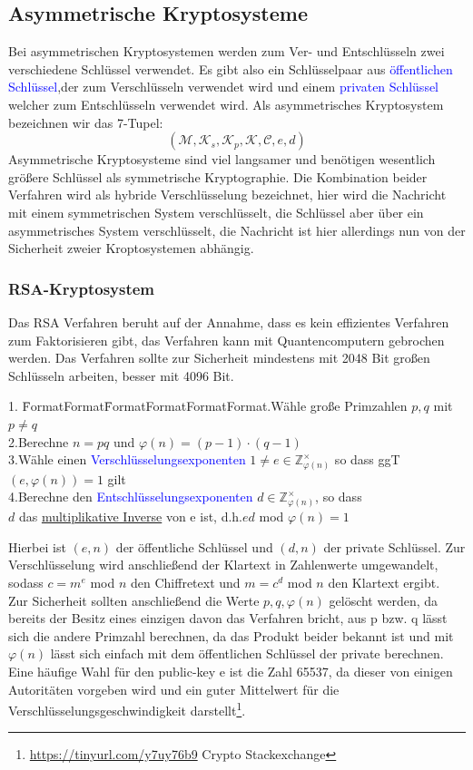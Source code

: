 \documentclass[a4paper,12pt,leqno]{article}
\newcommand{\blue}[1]{\textcolor{blue}{#1}}
\begin{document}
\subsection{Asymmetrische Kryptosysteme}
Bei asymmetrischen Kryptosystemen werden zum Ver- und Entschlüsseln zwei verschiedene Schlüssel verwendet. Es gibt also ein Schlüsselpaar aus \blue{öffentlichen Schlüssel},der zum Verschlüsseln verwendet wird und einem \blue{privaten Schlüssel} welcher zum Entschlüsseln verwendet wird.
Als asymmetrisches Kryptosystem bezeichnen wir das 7-Tupel: $$(\mathcal{M},\mathcal{K}_s, \mathcal{K}_p,\mathcal{K},\mathcal{C},e,d)$$
Asymmetrische Kryptosysteme sind viel langsamer und benötigen wesentlich größere Schlüssel als symmetrische Kryptographie. Die Kombination beider Verfahren wird als hybride Verschlüsselung bezeichnet, hier wird die Nachricht mit einem symmetrischen System verschlüsselt, die Schlüssel aber über ein asymmetrisches System verschlüsselt, die Nachricht ist hier allerdings nun von der Sicherheit zweier Kroptosystemen abhängig.
\subsubsection{RSA-Kryptosystem}
Das RSA Verfahren beruht auf der Annahme, dass es kein effizientes Verfahren zum Faktorisieren gibt, das Verfahren kann mit Quantencomputern gebrochen werden.
Das Verfahren sollte zur Sicherheit mindestens mit 2048 Bit großen Schlüsseln arbeiten, besser mit 4096 Bit.
\begin{tabbing}
1. \= FormatFormat\= FormatFormatFormatFormat.\>Wähle große Primzahlen $p,q$ mit $p\neq q$\\
2.\>Berechne $n=pq$ und $\varphi(n)=(p-1)\cdot(q-1)$\\
3.\>Wähle einen \blue{Verschlüsselungsexponenten} $1\neq e\in \mathbb{Z}_{\varphi(n)}^\times$ so dass ggT$(e,\varphi(n))=1$ gilt\\
4.\>Berechne den \blue{Entschlüsselungsexponenten} $d\in\mathbb{Z}_{\varphi(n)}^\times$, so dass \\
\>\>$d$ das \hyperref[sec:euklid]{multiplikative Inverse} von e ist, d.h.$ed$ mod $\varphi(n)=1$
\end{tabbing}
Hierbei ist $(e,n)$ der öffentliche Schlüssel und $(d,n)$ der private Schlüssel.
Zur Verschlüsselung wird anschließend der Klartext in Zahlenwerte umgewandelt, sodass $c=m^e$ mod $n$ den Chiffretext und $m = c^d$ mod $n$ den Klartext ergibt.\\
Zur Sicherheit sollten anschließend die Werte $p,q,\varphi(n)$ gelöscht werden, da bereits der Besitz eines einzigen davon das Verfahren bricht, aus p bzw. q lässt sich die andere Primzahl berechnen, da das Produkt beider bekannt ist und mit $\varphi(n)$ lässt sich einfach mit dem öffentlichen Schlüssel der private berechnen.\\ Eine häufige Wahl für den public-key e ist die Zahl 65537, da dieser von einigen Autoritäten vorgeben wird und ein guter Mittelwert für die Verschlüsselungsgeschwindigkeit darstellt\footnote{\url{https://tinyurl.com/y7uy76b9} Crypto Stackexchange}.
\end{document}

